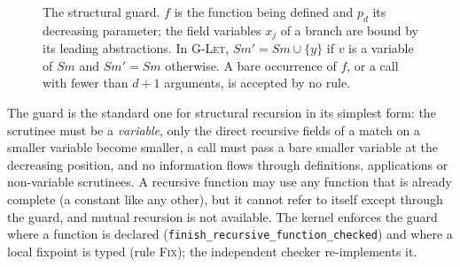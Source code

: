 \begin{figure}[t]
\centering
{}
\caption{The structural guard.
  $f$ is the function being defined and $p_d$ its decreasing parameter; the field variables $x_j$ of a branch are bound by its leading abstractions.
  In \textsc{G-Let}, $\mathit{Sm}'=\mathit{Sm}\cup\{y\}$ if $v$ is a variable of $\mathit{Sm}$ and $\mathit{Sm}'=\mathit{Sm}$ otherwise.
  A bare occurrence of $f$, or a call with fewer than $d+1$ arguments, is accepted by no rule.}
\label{fig:guard}
\end{figure}

The guard is the standard one for structural recursion \citep{gimenez94} in its simplest form: the scrutinee must be a \emph{variable}, only the direct recursive fields of a match on a smaller variable become smaller, a call must pass a bare smaller variable at the decreasing position, and no information flows through definitions, applications or non-variable scrutinees.
A recursive function may use any function that is already complete (a constant like any other), but it cannot refer to itself except through the guard, and mutual recursion is not available.
The kernel enforces the guard where a function is declared (\texttt{finish\_recursive\_function\_checked}) and where a local fixpoint is typed (rule \textsc{Fix}); the independent checker re-implements it.

